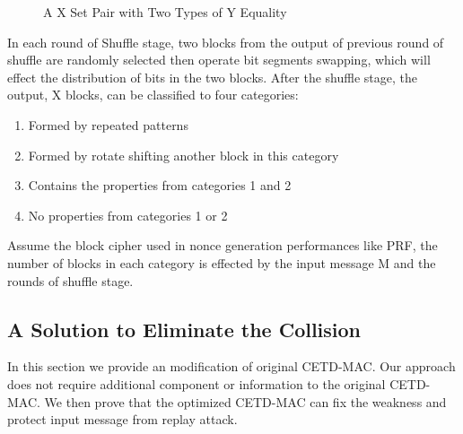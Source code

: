 \documentclass{article}
\begin{document}
\begin{figure}
\centering
{}
\caption{A X Set Pair with Two Types of Y Equality}
 \label{fig:y_both} %
\end{figure}
In each round of Shuffle stage, two blocks from the output of previous round of shuffle are randomly selected then operate bit segments swapping, which will effect the distribution of bits in the two blocks. After the shuffle stage, the output, X blocks, can be classified to four categories:
\begin{enumerate}
	\item Formed by repeated patterns
	\item Formed by rotate shifting another block in this category
	\item Contains the properties from categories 1 and 2
	\item No properties from categories 1 or 2
\end{enumerate}
Assume the block cipher used in nonce generation performances like PRF, the number of blocks in each category is effected by the input message M and the rounds of shuffle stage.  

\subsection{A Solution to Eliminate the Collision}
In this section we provide an modification of original CETD-MAC. Our approach does not require additional component or information to the original CETD-MAC. We then prove that the optimized CETD-MAC can fix the weakness and protect input message from replay attack.
\end{document}
